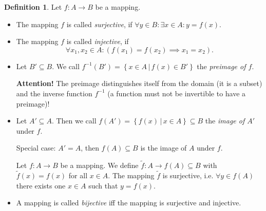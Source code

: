 \documentclass[a4paper,landscape,twocolumn]{article}
\theoremstyle{definition}
\newtheorem{defi}{Definition}
\newcommand\setdef[2]{\left\{#1\,|\,#2\right\}}
\begin{document}
\begin{defi}
  Let $f: A \to B$ be a mapping.
  \begin{itemize}
    \item
      The mapping $f$ is called \emph{surjective},
      if $\forall y \in B: \exists x \in A: y = f(x)$.
    \item
      The mapping $f$ is called \emph{injective}, if
      \[ \forall x_1, x_2 \in A: (f(x_1) = f(x_2) \implies x_1 = x_2). \]
    \item
      Let $B' \subseteq B$. We call $f^{-1}(B') = \setdef{x \in A}{f(x) \in B'}$ the \emph{preimage of $f$}.

      \textbf{Attention!} The preimage distinguishes itself from the domain (it is a subset)
      and the inverse function $f^{-1}$ (a function must not be invertible to have a preimage)!
    \item
      Let $A' \subseteq A$. Then we call $f(A') = \setdef{f(x)}{x \in A} \subseteq B$ the \emph{image of $A'$} under $f$.

      Special case: $A' = A$, then $f(A) \subseteq B$ is the image of $A$ under $f$.

      Let $f: A \to B$ be a mapping. We define $\tilde f: A \to f(A) \subseteq B$ with
      $\tilde f(x) = f(x)$ for all $x \in A$. The mapping $\tilde f$ is surjective, i.e. $\forall y \in f(A)$ there exists one $x \in A$ such that $y = f(x)$.
    \item
      A mapping is called \emph{bijective}
      iff the mapping is surjective and injective.
  \end{itemize}
\end{defi}
\end{document}
